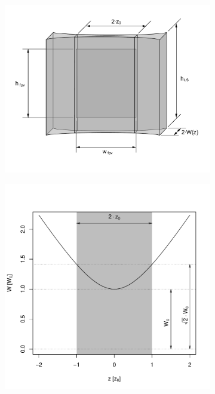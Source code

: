       \begin{figure}[b!]
        \centering
        \begin{subfigure}[b]{0.7\textwidth}
            \centering
            \includegraphics[width=\textwidth]{FOV}
            \caption{}
            \label{fig:fov}
        \end{subfigure}
        \begin{subfigure}[b]{0.49\textwidth}
            \centering
            \includegraphics[width=\textwidth]{width}

\end{subfigure}
\end{figure}
